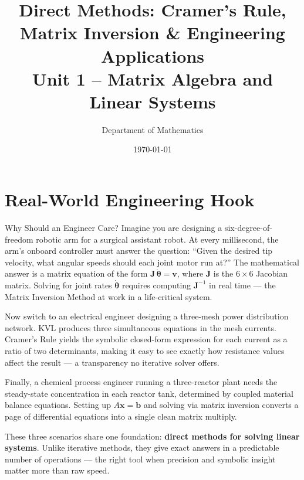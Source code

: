 \documentclass[12pt,a4paper]{article}
\title{\textbf{Direct Methods: Cramer's Rule, Matrix Inversion \& Engineering Applications} \\ \large Unit 1 -- Matrix Algebra and Linear Systems}
\author{Department of Mathematics}
\date{\today}
\begin{document}
\maketitle
\tableofcontents
\newpage

\section{Real-World Engineering Hook}

\begin{curiositybox}{Why Should an Engineer Care?}
Imagine you are designing a six-degree-of-freedom robotic arm for a surgical assistant robot. At every millisecond, the arm's onboard controller must answer the question: ``Given the desired tip velocity, what angular speeds should each joint motor run at?'' The mathematical answer is a matrix equation of the form \(\mathbf{J}\,\dot{\boldsymbol{\theta}} = \mathbf{v}\), where \(\mathbf{J}\) is the \(6 \times 6\) Jacobian matrix. Solving for joint rates \(\dot{\boldsymbol{\theta}}\) requires computing \(\mathbf{J}^{-1}\) in real time --- the Matrix Inversion Method at work in a life-critical system.

Now switch to an electrical engineer designing a three-mesh power distribution network. KVL produces three simultaneous equations in the mesh currents. Cramer's Rule yields the symbolic closed-form expression for each current as a ratio of two determinants, making it easy to see exactly how resistance values affect the result --- a transparency no iterative solver offers.

Finally, a chemical process engineer running a three-reactor plant needs the steady-state concentration in each reactor tank, determined by coupled material balance equations. Setting up \(A\mathbf{x} = \mathbf{b}\) and solving via matrix inversion converts a page of differential equations into a single clean matrix multiply.

These three scenarios share one foundation: \textbf{direct methods for solving linear systems}. Unlike iterative methods, they give exact answers in a predictable number of operations --- the right tool when precision and symbolic insight matter more than raw speed.
\end{curiositybox}

\end{document}
